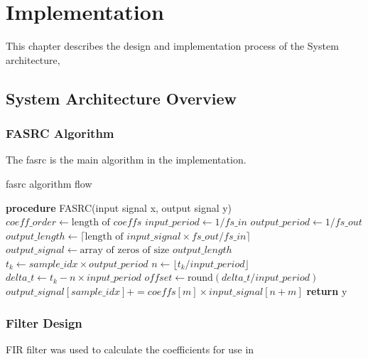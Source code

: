 \chapter{Implementation}
\label{chap:implementation}
This chapter describes the design and implementation process of the System architecture,

\section{System Architecture Overview}
\subsection{FASRC Algorithm}
The \acrfull{fasrc} is the main algorithm in the implementation.


\begin{algorithm}
\caption{\acrshort{fasrc} algorithm flow}\label{alg:main}
\begin{algorithmic}
\State \textbf{procedure} FASRC(input signal x, output signal y)
\State $coeff\_order \gets \text{length of } coeffs$
    \State $input\_period \gets 1 / fs\_in$
    \State $output\_period \gets 1 / fs\_out$
    \State $output\_length \gets \lceil \text{length of } input\_signal \times fs\_out / fs\_in \rceil$
    \State $output\_signal \gets \text{array of zeros of size } output\_length$
        \State $t_k \gets sample\_idx \times output\_period$
        \State $n \gets \lfloor t_k / input\_period \rfloor$
        \State $delta\_t \gets t_k - n \times input\_period$
        \State $offset \gets \text{round}(delta\_t / input\_period)$
                \State $output\_signal[sample\_idx] \mathrel{{+}{=}} coeffs[m] \times input\_signal[n + m]$
            \EndIf
        \EndFor
    \EndFor
    \State \textbf{return} y
\end{algorithmic}
\end{algorithm}



\subsection{Filter Design}
FIR filter was used to calculate the coefficients for use in 


